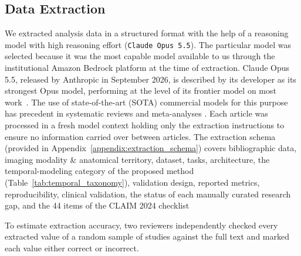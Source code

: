 \subsection{Data Extraction}
\label{sec:full-text-screening}
We extracted analysis data in a structured format with the help of a reasoning model with high reasoning effort (\texttt{Claude Opus 5.5}). The particular model was selected because it was the most capable model available to us through the institutional Amazon Bedrock platform at the time of extraction. Claude Opus 5.5, released by Anthropic in September 2026, is described by its developer as its strongest Opus model, performing at the level of its frontier model on most work~\cite{anthropic2026opus55}. The use of state-of-the-art (SOTA) commercial models for this purpose has precedent in systematic reviews and meta-analyses \cite{konet2024extraction,khan2025collaborative,reason2024automation}. Each article was processed in a fresh model context holding only the extraction instructions to ensure no information carried over between articles. The extraction schema (provided in Appendix~\ref{appendix:extraction_schema}) covers bibliographic data, imaging modality \& anatomical territory, dataset, tasks, architecture, the temporal-modeling category of the proposed method (Table~\ref{tab:temporal_taxonomy}), validation design, reported metrics, reproducibility, clinical validation, the status of each manually curated research gap, and the 44 items of the CLAIM 2024 checklist~\cite{Tejani2024} 


To estimate extraction accuracy, two reviewers independently checked every extracted value of a random sample of studies against the full text and marked each value either correct or incorrect.

